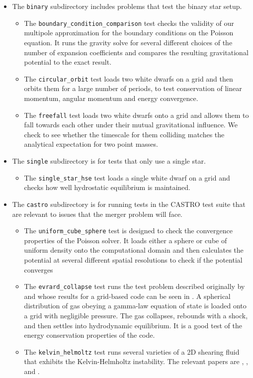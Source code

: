 \documentclass[12pt]{book}
\begin{document}
\begin{itemize}
  \item The \texttt{binary} subdirectory includes problems that test the binary star setup.
  \begin{itemize}
    \item The \texttt{boundary\_condition\_comparison} test checks the validity of our 
      multipole approximation for the boundary conditions on the Poisson equation. It runs
      the gravity solve for several different choices of the number of expansion coefficients
      and compares the resulting gravitational potential to the exact result.
    \item The \texttt{circular\_orbit} test loads two white dwarfs on a grid and then orbits
      them for a large number of periods, to test conservation of linear momentum,
      angular momentum and energy convergence.
    \item The \texttt{freefall} test loads two white dwarfs onto a grid and allows them to fall towards
      each other under their mutual gravitational influence. We check to see whether the timescale for them
      colliding matches the analytical expectation for two point masses.
  \end{itemize}
  
  \item The \texttt{single} subdirectory is for tests that only use a single star.
  \begin{itemize}
    \item The \texttt{single\_star\_hse} test loads a single white dwarf on a grid and checks how well 
      hydrostatic equilibrium is maintained.
  \end{itemize}

  \item The \texttt{castro} subdirectory is for running tests in the CASTRO test suite that are relevant
  to issues that the merger problem will face.
  \begin{itemize}
    \item The \texttt{uniform\_cube\_sphere} test is designed to check the convergence
        properties of the Poisson solver. It loads either a sphere or cube of uniform density
        onto the computational domain and then calculates the potential at several different
        spatial resolutions to check if the potential converges
    \item The \texttt{evrard\_collapse} test runs the test problem described originally by 
      \cite{evrard:1988} and whose results for a grid-based code can be seen in \cite{arepo}. A spherical
      distribution of gas obeying a gamma-law equation of state is loaded onto a grid with negligible 
      pressure. The gas collapses, rebounds with a shock, and then settles into hydrodynamic equilibrium.
      It is a good test of the energy conservation properties of the code.
    \item The \texttt{kelvin\_helmoltz} test runs several varieties of a 2D shearing fluid that exhibits the 
      Kelvin-Helmholtz instability. The relevant papers are \cite{robertson:2010}, \cite{arepo}, and \cite{mcnally:2012}.
  \end{itemize}


\end{itemize}
\end{document}
